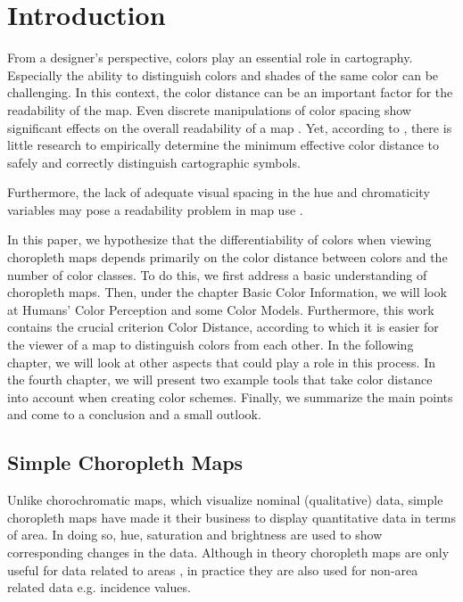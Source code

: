 \section{Introduction}
From a designer's perspective, colors play an essential role in cartography. Especially the ability to distinguish colors and shades of the same color can be challenging. In this context, the color distance can be an important factor for the readability of the map. Even discrete manipulations of color spacing show significant effects on the overall readability of a map \parencite{brychtovaC2015,brychtova2015, brychtovaV2014,brychtovaC2016}. Yet, according to \textcite{brychtovaC2017}, there is little research to empirically determine the minimum effective color distance to safely and correctly distinguish cartographic symbols. 

Furthermore, the lack of adequate visual spacing in the hue and chromaticity variables may pose a readability problem in map use \parencite{chesneau2007, steinrucken2013, stigmar2010}.

In this paper, we hypothesize that the differentiability of colors when viewing choropleth maps depends primarily on the color distance between colors and the number of color classes. To do this, we first address a basic understanding of choropleth maps. Then, under the chapter Basic Color Information, we will look at Humans' Color Perception and some Color Models. Furthermore, this work contains the crucial criterion Color Distance, according to which it is easier for the viewer of a map to distinguish colors from each other. In the following chapter, we will look at other aspects that could play a role in this process. In the fourth chapter, we will present two example tools that take color distance into account when creating color schemes. Finally, we summarize the main points and come to a conclusion and a small outlook. 

\subsection{Simple Choropleth Maps}
Unlike chorochromatic maps, which visualize nominal (qualitative) data, simple choropleth maps have made it their business to display quantitative data in terms of area. In doing so, hue, saturation and brightness are used to show corresponding changes in the data. Although in theory choropleth maps are only useful for data related to areas \parencite{hruby2016, schiewe2015}, in practice they are also used for non-area related data e.g. incidence values.

